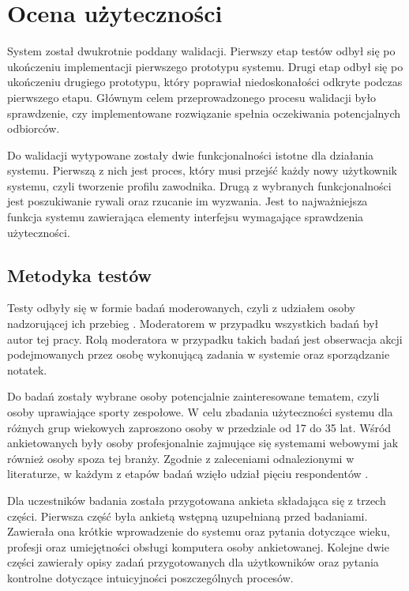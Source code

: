 \chapter{Ocena użyteczności}

System został dwukrotnie poddany walidacji. Pierwszy etap testów odbył się po ukończeniu implementacji pierwszego prototypu systemu. Drugi etap odbył się po ukończeniu drugiego prototypu, który poprawiał niedoskonałości odkryte podczas pierwszego etapu. 
Głównym celem przeprowadzonego procesu walidacji było sprawdzenie, czy implementowane rozwiązanie spełnia oczekiwania potencjalnych odbiorców. 

Do walidacji wytypowane zostały dwie funkcjonalności istotne dla działania systemu. Pierwszą z nich jest proces, który musi przejść każdy nowy użytkownik systemu, czyli tworzenie profilu zawodnika. Drugą z wybranych funkcjonalności jest poszukiwanie rywali oraz rzucanie im wyzwania. Jest to najważniejsza funkcja systemu zawierająca elementy interfejsu wymagające sprawdzenia użyteczności.


\section{Metodyka testów}

Testy odbyły się w formie badań moderowanych, czyli z udziałem osoby nadzorującej ich przebieg \cite{usstudywhatis}. Moderatorem w przypadku wszystkich badań był autor tej pracy. Rolą moderatora w przypadku takich badań jest obserwacja akcji podejmowanych przez osobę wykonującą zadania w systemie oraz sporządzanie notatek.

Do badań zostały wybrane osoby potencjalnie zainteresowane tematem, czyli osoby uprawiające sporty zespołowe. W celu zbadania użyteczności systemu dla różnych grup wiekowych zaproszono osoby w przedziale od 17 do 35 lat. Wśród ankietowanych były osoby profesjonalnie zajmujące się systemami webowymi jak również osoby spoza tej branży. Zgodnie z zaleceniami odnalezionymi w literaturze, w każdym z etapów badań wzięło udział pięciu respondentów \cite{usabilitystudy}.

Dla uczestników badania została przygotowana ankieta składająca się z trzech części. Pierwsza część była ankietą wstępną uzupełnianą przed badaniami. Zawierała ona krótkie wprowadzenie do systemu oraz pytania dotyczące wieku, profesji oraz umiejętności obsługi komputera osoby ankietowanej. Kolejne dwie części zawierały opisy zadań przygotowanych dla użytkowników oraz pytania kontrolne dotyczące intuicyjności poszczególnych procesów. 

